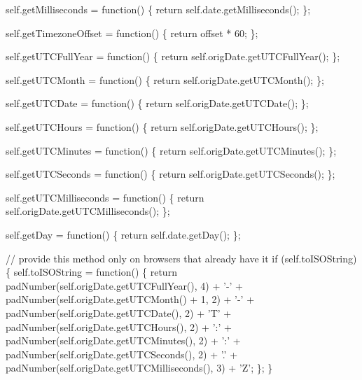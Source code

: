 \begin{DoxyCodeInclude}
  \textcolor{keyword}{self}.getMilliseconds = \textcolor{keyword}{function}() \{
    \textcolor{keywordflow}{return} \textcolor{keyword}{self}.date.getMilliseconds();
  \};

  \textcolor{keyword}{self}.getTimezoneOffset = \textcolor{keyword}{function}() \{
    \textcolor{keywordflow}{return} offset * 60;
  \};

  \textcolor{keyword}{self}.getUTCFullYear = \textcolor{keyword}{function}() \{
    \textcolor{keywordflow}{return} \textcolor{keyword}{self}.origDate.getUTCFullYear();
  \};

  \textcolor{keyword}{self}.getUTCMonth = \textcolor{keyword}{function}() \{
    \textcolor{keywordflow}{return} \textcolor{keyword}{self}.origDate.getUTCMonth();
  \};

  \textcolor{keyword}{self}.getUTCDate = \textcolor{keyword}{function}() \{
    \textcolor{keywordflow}{return} \textcolor{keyword}{self}.origDate.getUTCDate();
  \};

  \textcolor{keyword}{self}.getUTCHours = \textcolor{keyword}{function}() \{
    \textcolor{keywordflow}{return} \textcolor{keyword}{self}.origDate.getUTCHours();
  \};

  \textcolor{keyword}{self}.getUTCMinutes = \textcolor{keyword}{function}() \{
    \textcolor{keywordflow}{return} \textcolor{keyword}{self}.origDate.getUTCMinutes();
  \};

  \textcolor{keyword}{self}.getUTCSeconds = \textcolor{keyword}{function}() \{
    \textcolor{keywordflow}{return} \textcolor{keyword}{self}.origDate.getUTCSeconds();
  \};

  \textcolor{keyword}{self}.getUTCMilliseconds = \textcolor{keyword}{function}() \{
    \textcolor{keywordflow}{return} \textcolor{keyword}{self}.origDate.getUTCMilliseconds();
  \};

  \textcolor{keyword}{self}.getDay = \textcolor{keyword}{function}() \{
    \textcolor{keywordflow}{return} \textcolor{keyword}{self}.date.getDay();
  \};

  \textcolor{comment}{// provide this method only on browsers that already have it}
  \textcolor{keywordflow}{if} (\textcolor{keyword}{self}.toISOString) \{
    \textcolor{keyword}{self}.toISOString = \textcolor{keyword}{function}() \{
      \textcolor{keywordflow}{return} padNumber(\textcolor{keyword}{self}.origDate.getUTCFullYear(), 4) + \textcolor{charliteral}{'-'} +
            padNumber(\textcolor{keyword}{self}.origDate.getUTCMonth() + 1, 2) + \textcolor{charliteral}{'-'} +
            padNumber(\textcolor{keyword}{self}.origDate.getUTCDate(), 2) + \textcolor{charliteral}{'T'} +
            padNumber(\textcolor{keyword}{self}.origDate.getUTCHours(), 2) + \textcolor{charliteral}{':'} +
            padNumber(\textcolor{keyword}{self}.origDate.getUTCMinutes(), 2) + \textcolor{charliteral}{':'} +
            padNumber(\textcolor{keyword}{self}.origDate.getUTCSeconds(), 2) + \textcolor{charliteral}{'.'} +
            padNumber(\textcolor{keyword}{self}.origDate.getUTCMilliseconds(), 3) + \textcolor{charliteral}{'Z'};
    \};
  \}


\end{DoxyCodeInclude}
